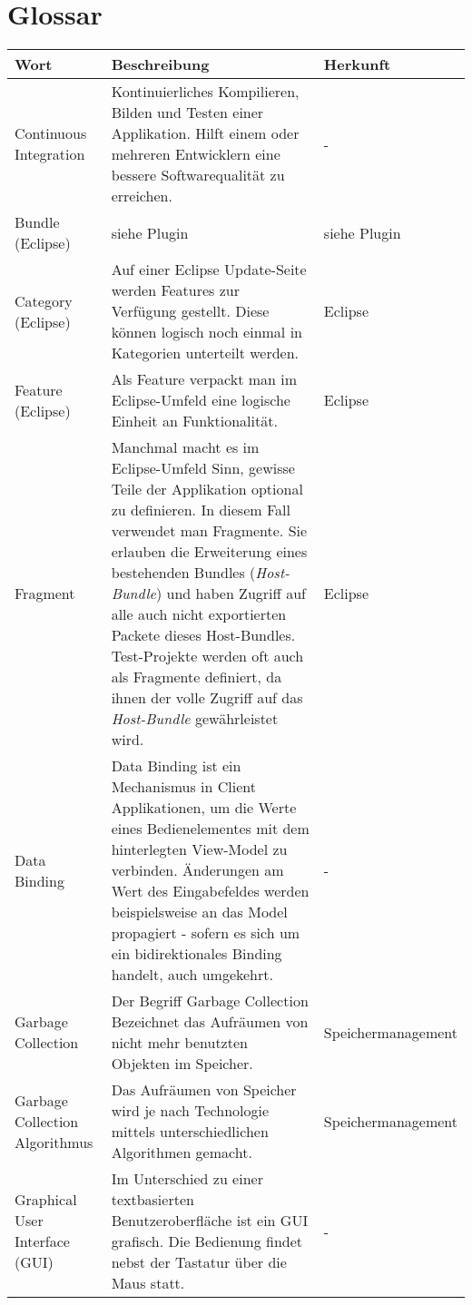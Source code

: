 \chapter*{Glossar}\label{glossar}
  \begin{longtable}{|p{4.5cm}|p{6cm}|p{4.1cm}|}
\hline
  \textbf{Wort} & \textbf{Beschreibung} & \textbf{Herkunft}\\\hline
  Continuous Integration  & Kontinuierliches Kompilieren, Bilden und Testen einer Applikation. Hilft einem oder mehreren Entwicklern eine bessere Softwarequalität zu erreichen.&-\\\hline
  Bundle (Eclipse) & siehe Plugin & siehe Plugin\\\hline
  Category (Eclipse) & Auf einer Eclipse Update-Seite werden Features zur Verfügung gestellt. Diese können logisch noch einmal in Kategorien unterteilt werden. & Eclipse\\\hline
  Feature (Eclipse) & Als Feature verpackt man im Eclipse-Umfeld eine logische Einheit an Funktionalität. & Eclipse\\\hline
  Fragment & Manchmal macht es im Eclipse-Umfeld Sinn, gewisse Teile der Applikation optional zu definieren. In diesem Fall verwendet man Fragmente. Sie erlauben die Erweiterung eines bestehenden Bundles (\textit{Host-Bundle}) und haben Zugriff auf alle auch nicht exportierten Packete dieses Host-Bundles. Test-Projekte werden oft auch als Fragmente definiert, da ihnen der volle Zugriff auf das \textit{Host-Bundle} gewährleistet wird. & Eclipse\\\hline
  Data Binding & Data Binding ist ein Mechanismus in Client Applikationen, um die Werte eines Bedienelementes mit dem hinterlegten View-Model zu verbinden. Änderungen am Wert des Eingabefeldes werden beispielsweise an das Model propagiert - sofern es sich um ein bidirektionales Binding handelt, auch umgekehrt.  & - \\\hline
  Garbage Collection & Der Begriff Garbage Collection Bezeichnet das Aufräumen von nicht mehr benutzten Objekten im Speicher.& Speichermanagement \\\hline
  Garbage Collection Algorithmus & Das Aufräumen von Speicher wird je nach Technologie mittels unterschiedlichen Algorithmen gemacht.  & Speichermanagement \\\hline
 Graphical User Interface (GUI)& Im Unterschied zu einer textbasierten Benutzeroberfläche ist ein GUI grafisch. Die Bedienung findet nebst der Tastatur über die Maus statt. & -\\\hline

\end{longtable}

